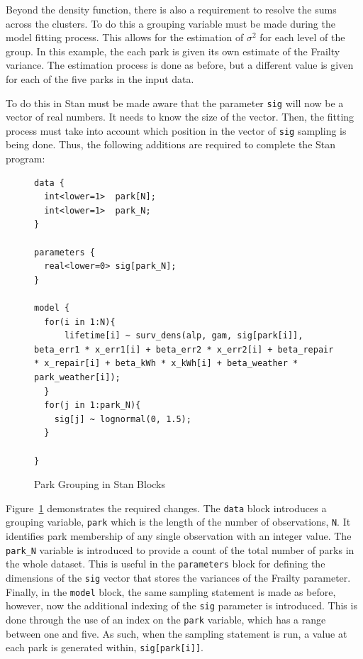 Beyond the density function, there is also a requirement to resolve the sums across the clusters. To do this a grouping variable must be made during the model fitting process. This allows for the estimation of $\sigma^2$ for each level of the group. In this example, the each park is given its own estimate of the Frailty variance. The estimation process is done as before, but a different value is given for each of the five parks in the input data.

To do this in Stan must be made aware that the parameter \lstinline{sig} will now be a vector of real numbers. It needs to know the size of the vector. Then, the fitting process must take into account which position in the vector of \lstinline{sig} sampling is being done. Thus, the following additions are required to complete the Stan program:


\begin{figure}[htbp]
    \centering
    \begin{lstlisting}[belowskip=-2 \baselineskip]
data {
  int<lower=1>  park[N];
  int<lower=1>  park_N;
}

parameters {
  real<lower=0> sig[park_N];
}

model {
  for(i in 1:N){
      lifetime[i] ~ surv_dens(alp, gam, sig[park[i]], beta_err1 * x_err1[i] + beta_err2 * x_err2[i] + beta_repair * x_repair[i] + beta_kWh * x_kWh[i] + beta_weather * park_weather[i]);
  }
  for(j in 1:park_N){
    sig[j] ~ lognormal(0, 1.5);
  }

}\end{lstlisting}
    \caption{Park Grouping in Stan Blocks}
    \label{park_group}
\end{figure}


Figure~\ref{park_group} demonstrates the required changes. The \lstinline{data} block introduces a grouping variable, \lstinline{park} which is the length of the number of observations, \lstinline{N}. It identifies park membership of any single observation with an integer value. The \lstinline{park_N} variable is introduced to provide a count of the total number of parks in the whole dataset. This is useful in the \lstinline{parameters} block for defining the dimensions of the \lstinline{sig} vector that stores the variances of the Frailty parameter. Finally, in the \lstinline{model} block, the same sampling statement is made as before, however, now the additional indexing of the \lstinline{sig} parameter is introduced. This is done through the use of an index on the \lstinline{park} variable, which has a range between one and five. As such, when the sampling statement is run, a value at each park is generated within, \lstinline{sig[park[i]]}.



